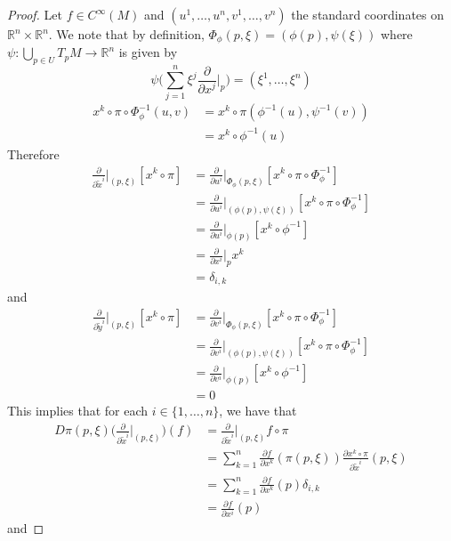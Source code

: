 \documentclass{book}
\theoremstyle{definition}
\newcommand{\del}{\delta}
\newcommand{\R}{\mathbb{R}}
\DeclareMathOperator*{\0}{\mbf{0}}
\DeclareMathOperator*{\1}{\mbf{1}}
\newcommand{\p}{\partial}
\begin{document}
	\begin{proof}
		Let $f \in C^{\infty}(M)$ and $(u^1, \ldots, u^n, v^1, \ldots, v^n)$ the standard coordinates on $\R^n \times \R^n$. We note that by definition, $\Phi_{\phi}(p, \xi) = (\phi(p), \psi(\xi))$ where $\psi: \bigcup\limits_{p \in U} T_pM \rightarrow \R^n$ is given by 
		$$\psi \bigg (\sum_{j=1}^n \xi^j \frac{\p}{\p x^j} \bigg|_p \bigg) = (\xi^1, \ldots, \xi^n)$$
		\begin{align*}
			 x^k \circ \pi \circ \Phi_{\phi}^{-1}(u,v)
			 & =  x^k \circ \pi (\phi^{-1}(u), \psi^{-1}(v)) \\
			 & = x^k \circ \phi^{-1}(u) 
		\end{align*}	
		Therefore
		\begin{align*}
			\frac{\p }{\p \tilde{x}^i} \bigg|_{(p,\xi)} [x^k \circ \pi  ]
			& = \frac{\p }{\p u^i} \bigg|_{\Phi_{\phi}(p,\xi)}[ x^k \circ \pi \circ \Phi_{\phi}^{-1} ]\\
			& = \frac{\p }{\p u^i} \bigg|_{(\phi(p), \psi(\xi))} [x^k \circ \pi \circ \Phi_{\phi}^{-1}] \\
			& = \frac{\p }{\p u^i} \bigg|_{\phi(p)}  [x^k \circ \phi^{-1}] \\
			& =  \frac{\p }{\p x^i} \bigg|_{p} x^k \\
			& = \del_{i,k}
		\end{align*}
		and 
		\begin{align*}
			\frac{\p }{\p \tilde{y}^i} \bigg|_{(p,\xi)} [x^k \circ \pi  ]
			& = \frac{\p }{\p v^i} \bigg|_{\Phi_{\phi}(p,\xi)}[ x^k \circ \pi \circ \Phi_{\phi}^{-1} ]\\
			& = \frac{\p }{\p v^i} \bigg|_{(\phi(p), \psi(\xi))} [x^k \circ \pi \circ \Phi_{\phi}^{-1}] \\
			& = \frac{\p }{\p v^i} \bigg|_{\phi(p)}  [x^k \circ \phi^{-1}] \\
			& = 0
		\end{align*}
		This implies that for each $i \in \{1, \ldots, n\}$, we have that 
		\begin{align*}
			D \pi (p, \xi) \bigg( \frac{\p}{\p \tilde{x}^i } \bigg|_{(p, \xi)} \bigg) (f)
			& = \frac{\p}{\p \tilde{x}^i} \bigg|_{(p, \xi)} f \circ \pi \\
			& = \sum_{k=1}^n \frac{\p f }{\p x^k}(\pi (p,\xi)) \frac{\p x^k \circ \pi }{\p \tilde{x}^i}(p,\xi) \\
			& = \sum_{k=1}^n \frac{\p f }{\p x^k}(p) \del_{i,k} \\
			& = \frac{\p f }{\p x^i}(p) 
		\end{align*}
		and 

\end{proof}
\end{document}
